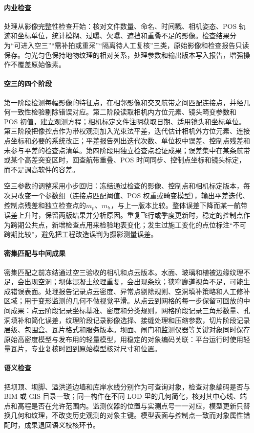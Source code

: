 \paragraph{内业检查}处理从影像完整性检查开始：核对文件数量、命名、时间戳、相机姿态、POS 轨迹和坐标单位，统计模糊、过曝、欠曝、遮挡和重叠不足的影像。检查结果分为“可进入空三”“需补拍或重采”“隔离待人工复核”三类，原始影像和检查报告只读保存。匀光匀色保持地物纹理的相对关系，处理参数和输出版本写入报告，增强操作不覆盖原始像素。

\paragraph{空三的四个阶段}第一阶段检测每幅影像的特征点，在相邻影像和交叉航带之间匹配连接点，并经几何一致性检验剔除错误对应。第二阶段读取相机内方位元素、镜头畸变参数和 POS 初值，建立观测方程；相机标定文件注明获取日期、适用镜头和坐标单位。第三阶段把像控点作为带权观测加入光束法平差，迭代估计相机外方位元素、连接点坐标和必要的系统改正；平差报告列出迭代次数、单位权中误差、控制点残差和未参与平差的检查点清单。第四阶段用独立检查点验证成果；误差集中在某条航带或某个高差突变区时，回查航带重叠、POS 时间同步、控制点坐标和镜头标定，而不是调高软件的容差。

空三参数的调整采用小步回归：冻结通过检查的影像、控制点和相机标定版本，每次只改变一个参数组（连接点匹配阈值、POS 权重或畸变模型），输出平差迭代、控制点残差和独立检查点的$m_p$、$m_h$，与上一版本比较。整体误差下降而某一航带误差上升时，保留两版结果并分析原因。重复飞行或季度更新时，稳定的控制点作为跨期公共点，新增检查点用来检验地表变化；发生过施工变化的点位标注“不可跨期比较”，避免把工程改造误判为摄影测量误差。

\paragraph{密集匹配与中间成果}密集匹配之前冻结通过空三验收的相机和点云版本。水面、玻璃和植被边缘纹理不足，会出现空洞；坝体混凝土纹理重复，会出现条纹；狭窄廊道视角不足，可能生成错误表面。处理报告记录点云密度、异常点剔除规则、空洞填补策略和人工修补区域；用于变形监测的几何不做视觉平滑。从点云到网格的每一步保留可回放的中间成果：点云阶段记录坐标基准、密度和分类规则，网格阶段记录三角形数量、孔洞填补和简化误差，纹理阶段记录影像选择、接缝处理和压缩参数，切片阶段记录层级、包围盒、瓦片格式和服务版本。坝面、闸门和监测仪器等关键对象同时保存原始高密度模型与发布用的轻量模型，用稳定的对象编码关联：平台运行时使用轻量瓦片，专业复核时回到原始模型核对尺寸和位置。

\paragraph{语义检查}把坝顶、坝脚、溢洪道边墙和库岸水线分别作为可查询对象，检查对象编码是否与 BIM 或 GIS 目录一致；同一构件在不同 LOD 里的几何简化，核对其中心线、端点和高程是否在允许范围内。监测仪器的位置与实测点号一一对应，模型更新只替换几何和纹理，不改变历史观测的对象主键。模型表面与控制点一致而对象属性错配时，成果退回语义校核环节。

